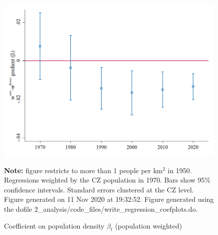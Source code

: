\begin{figure}[!h]
\centering
\caption{Coefficient on population density $ \beta_t $ (population weighted)}
\includegraphics[width=1\textwidth]{../2_analysis/output/figures/baseline_w_l_czone_density_full_time}
\par \begin{minipage}[h]{\textwidth}{\tiny\textbf{Note:} figure restricts to more than 1 people per km$^2$ in 1950. Regressions weighted by the CZ population in 1970. Bars show 95\% confidence intervals. Standard errors clustered at the CZ level. Figure generated on 11 Nov 2020 at 19:32:52. Figure generated using the dofile 2\_analysis/code\_files/write\_regression\_coefplots.do.}\end{minipage}
\end{figure}
